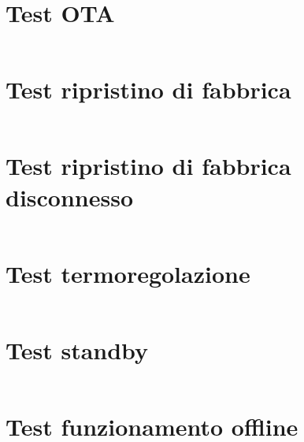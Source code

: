 \documentclass[12pt,a4paper,twoside,titlepage]{book}
\begin{document}
\section{Test OTA}
\label{section:impl_test_ota}
\inputminted[]{python3}{src/test_ota.py}

\section{Test ripristino di fabbrica}
\label{section:impl_test_factory_reset}
\inputminted[]{python3}{src/test_factory_reset.py}

\section{Test ripristino di fabbrica disconnesso}
\label{section:impl_test_factory_reset_offline}
\inputminted[]{python3}{src/test_factory_reset_offline.py}

\section{Test termoregolazione}
\label{section:impl_test_thermoregulation}
\inputminted[]{python3}{src/test_thermoregulation.py}

\section{Test standby}
\label{section:impl_test_standby}
\inputminted[]{python3}{src/test_standby.py}

\section{Test funzionamento offline}
\label{section:impl_test_offline_working}
\inputminted[]{python3}{src/test_offline_working.py}

\clearpage

\printglossary
\printglossary[type=\acronymtype]
\end{document}
